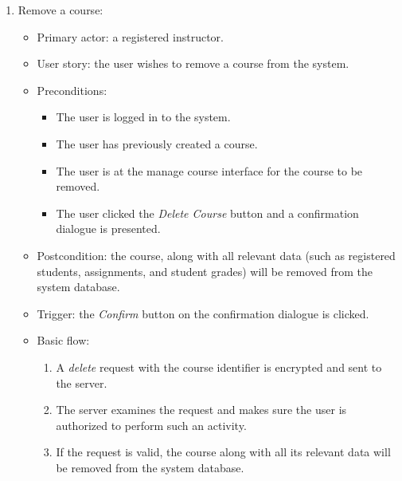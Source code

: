 \begin{enumerate}
\item Remove a course:
\begin{itemize}
    \item Primary actor: a registered instructor.
    \item User story: the user wishes to remove a course from the system.
    \item Preconditions:
        \begin{itemize}
            \item The user is logged in to the system.
            \item The user has previously created a course.
            \item The user is at the manage course interface for the course
                to be removed.
            \item The user clicked the \emph{Delete Course} button and a
                confirmation dialogue is presented.
        \end{itemize}
    \item Postcondition:
        the course, along with all relevant data (such as registered students,
        assignments, and student grades) will be removed from the system
        database.
    \item Trigger: the \emph{Confirm} button on the confirmation dialogue is
        clicked.
    \item Basic flow:
        \begin{enumerate}
            \item A \emph{delete} request with the course identifier is encrypted
                and sent to the server.
            \item The server examines the request and makes sure the user is
                authorized to perform such an activity.
            \item If the request is valid, the course along with all its
                relevant data will be removed from the system database.
        \end{enumerate}
\end{itemize}


\end{enumerate}
